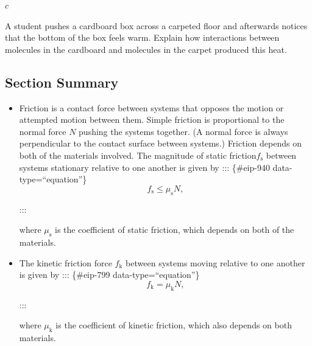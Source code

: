\documentclass[
]{book}
\newenvironment{ap-test-prep}{}{}
\begin{document}
\begin{ap-test-prep}
\leavevmode\hypertarget{import-auto-id0000022}{}%
\(c\)

\hypertarget{import-auto-id0000024}{}
\leavevmode\hypertarget{import-auto-id0000025}{}%
A student pushes a cardboard box across a carpeted floor and afterwards
notices that the bottom of the box feels warm. Explain how interactions
between molecules in the cardboard and molecules in the carpet produced
this heat.

\end{ap-test-prep}

\hypertarget{fs-id1388312-summary}{}
\hypertarget{section-summary-14}{%
\subsection{Section Summary}\label{section-summary-14}}

\begin{itemize}
\item
  \protect\hypertarget{import-auto-id1165296328554}{}{Friction is a contact force between systems that opposes the motion
  or attempted motion between them. Simple friction is proportional to
  the normal force \(N{}\) pushing the systems together. (A normal force
  is always perpendicular to the contact surface between systems.)
  Friction depends on both of the materials involved. The magnitude of
  static friction\(f_{\text{s}}{}\) between systems stationary relative
  to one another is given by}
  ::: \{\#eip-940 data-type=``equation''\}
  \[{{{f_{\text{s}} \leq \mu_{\text{s}}}N},}{}\]

  :::

  where \(\mu_{\text{s}}{}\) is the coefficient of static friction,
  which depends on both of the materials.
\item
  \protect\hypertarget{import-auto-id1165298621900}{}{The kinetic friction force \(f_{\text{k}}{}\) between systems moving
  relative to one another is given by}
  ::: \{\#eip-799 data-type=``equation''\}
  \[{{{f_{\text{k}} = \mu_{\text{k}}}N},}{}\]

  :::

  where \(\mu_{\text{k}}{}\) is the coefficient of kinetic friction,
  which also depends on both materials.
\end{itemize}
\end{document}

